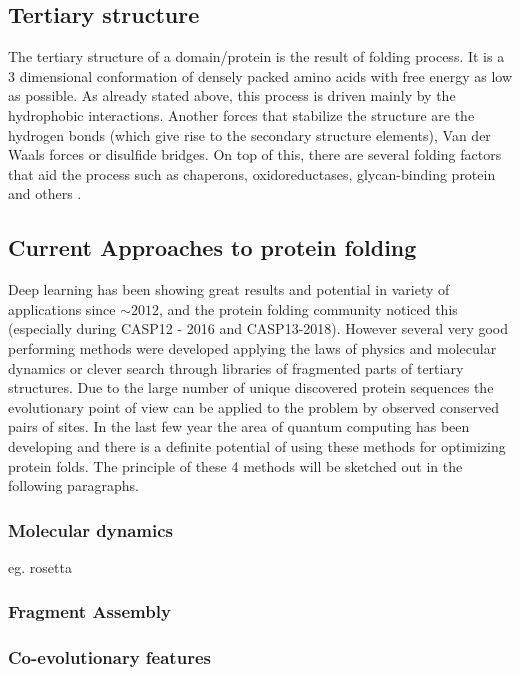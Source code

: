 \subsection{Tertiary structure}

The tertiary structure of a domain/protein is the result of folding process. It is a 3 dimensional conformation of densely packed amino acids with free energy as low as possible. As already stated above, this process is driven mainly by the hydrophobic interactions. Another forces that stabilize the structure are the hydrogen bonds (which give rise to the secondary structure elements), Van der Waals forces or disulfide bridges. On top of this, there are several folding factors that aid the process such as chaperons, oxidoreductases, glycan-binding protein and others \cite{principles_of_pf}.

\subsection{Current Approaches to protein folding}

Deep learning has been showing great results and potential in variety of applications since $\sim2012$, and the protein folding community noticed this (especially during CASP12 - 2016 and CASP13-2018). However several very good performing methods were developed applying the laws of physics and molecular dynamics or clever search through libraries of fragmented parts of tertiary structures. Due to the large number of unique discovered protein sequences the evolutionary point of view can be applied to the problem by observed conserved pairs of sites. In the last few year the area of quantum computing has been developing and there is a definite potential of using these methods for optimizing protein folds. The principle of these 4 methods will be sketched out in the following paragraphs.

\subsubsection{Molecular dynamics}

eg. rosetta

\subsubsection{Fragment Assembly}

\subsubsection{Co-evolutionary features}


